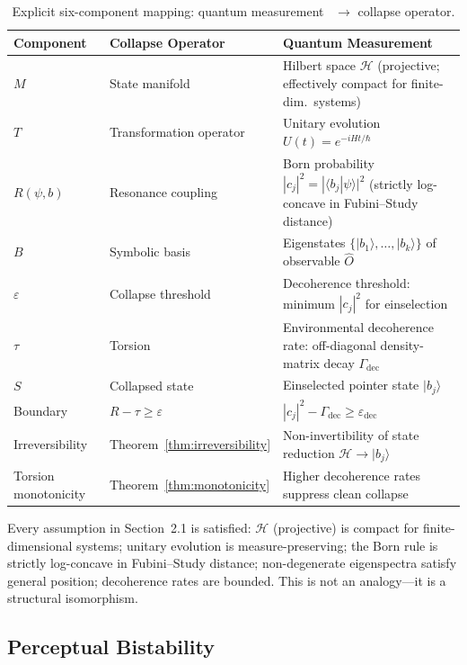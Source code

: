 \documentclass[11pt]{article}
\theoremstyle{plain}
\begin{document}
\begin{table}[h]
\centering
\caption{Explicit six-component mapping: quantum measurement~\cite{zurek2003} $\to$ collapse
operator.}
\begin{tabular}{>{\raggedright\arraybackslash}p{}
                >{\raggedright\arraybackslash}p{}
                >{\raggedright\arraybackslash}p{}}
\toprule
\textbf{Component} & \textbf{Collapse Operator} & \textbf{Quantum Measurement} \\
\midrule
$M$ & State manifold &
  Hilbert space $\mathcal{H}$ (projective; effectively compact for finite-dim.\ systems) \\
$T$ & Transformation operator & Unitary evolution $U(t) = e^{-iHt/\hbar}$ \\
$R(\psi, b)$ & Resonance coupling &
  Born probability $|c_j|^2 = |\langle b_j|\psi\rangle|^2$ (strictly log-concave in
  Fubini--Study distance) \\
$B$ & Symbolic basis &
  Eigenstates $\{|b_1\rangle, \ldots, |b_k\rangle\}$ of observable $\hat{O}$ \\
$\varepsilon$ & Collapse threshold &
  Decoherence threshold: minimum $|c_j|^2$ for einselection \\
$\tau$ & Torsion &
  Environmental decoherence rate: off-diagonal density-matrix decay $\Gamma_{\mathrm{dec}}$ \\
$S$ & Collapsed state & Einselected pointer state $|b_j\rangle$ \\
\midrule
Boundary & $R - \tau \geq \varepsilon$ &
  $|c_j|^2 - \Gamma_{\mathrm{dec}} \geq \varepsilon_{\mathrm{dec}}$ \\
Irreversibility & Theorem~\ref{thm:irreversibility} &
  Non-invertibility of state reduction $\mathcal{H} \to |b_j\rangle$ \\
Torsion monotonicity & Theorem~\ref{thm:monotonicity} &
  Higher decoherence rates suppress clean collapse \\
\bottomrule
\end{tabular}
\end{table}

Every assumption in Section~2.1 is satisfied: $\mathcal{H}$ (projective) is compact for
finite-dimensional systems; unitary evolution is measure-preserving; the Born rule is strictly
log-concave in Fubini--Study distance; non-degenerate eigenspectra satisfy general position;
decoherence rates are bounded. This is not an analogy---it is a structural isomorphism.

\subsection{Perceptual Bistability}
\end{document}
